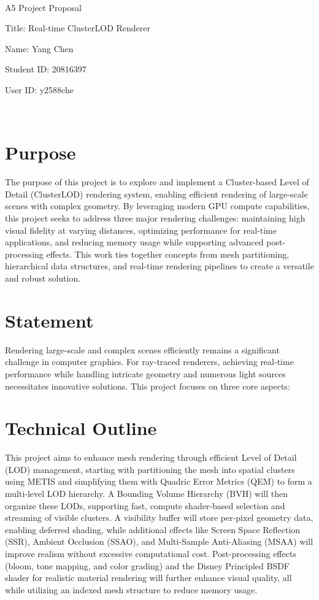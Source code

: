 \documentclass {article}
\begin{document}
~\vfill
\begin{center}
\Large

A5 Project Proposal

Title: Real-time ClusterLOD Renderer

Name: Yang Chen

Student ID: 20816397

User ID: y2588che
\end{center}
\vfill ~\vfill~
\newpage
\section{Purpose}
The purpose of this project is to explore and implement a Cluster-based Level of Detail (ClusterLOD) rendering system, enabling efficient rendering of large-scale scenes with complex geometry. By leveraging modern GPU compute capabilities, this project seeks to address three major rendering challenges: maintaining high visual fidelity at varying distances, optimizing performance for real-time applications, and reducing memory usage while supporting advanced post-processing effects. This work ties together concepts from mesh partitioning, hierarchical data structures, and real-time rendering pipelines to create a versatile and robust solution.

\section{Statement}
Rendering large-scale and complex scenes efficiently remains a significant challenge in computer graphics. For ray-traced renderers, achieving real-time performance while handling intricate geometry and numerous light sources necessitates innovative solutions. This project focuses on three core aspects:


\section{Technical Outline}
     This project aims to enhance mesh rendering through efficient Level of Detail (LOD) management, starting with partitioning 
     the mesh into spatial clusters using METIS and simplifying them with Quadric Error Metrics (QEM) to form a multi-level LOD 
     hierarchy. A Bounding Volume Hierarchy (BVH) will then organize these LODs, supporting fast, compute shader-based selection 
     and streaming of visible clusters. A visibility buffer will store per-pixel geometry data, enabling deferred shading, while 
     additional effects like Screen Space Reflection (SSR), Ambient Occlusion (SSAO), and Multi-Sample Anti-Aliasing (MSAA) will 
     improve realism without excessive computational cost. Post-processing effects (bloom, tone mapping, and color grading) and 
     the Disney Principled BSDF shader for realistic material rendering will further enhance visual quality, all while utilizing 
     an indexed mesh structure to reduce memory usage.
\end{document}
